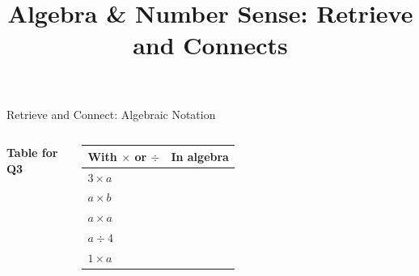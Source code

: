 \documentclass{beamer}
\title{Algebra \& Number Sense: Retrieve and Connects}
\author{}
\date{}
\newcommand{\ablank}[1]{%
  \alt<2>{\textcolor{red}{#1}}{\underline{\phantom{#1}}}%
}
\newcommand{\dheading}[1]{{\scriptsize\bfseries #1}\par\vspace{0.2em}}
\newcommand{\tblank}[1]{\ablank{\makebox[1.6em]{#1}}}
\newcommand{\tgiven}[1]{\makebox[1.6em]{#1}}
\begin{document}
\frame{\titlepage}

\begin{frame}[t]{Retrieve and Connect: Algebraic Notation}
\begin{columns}[T,onlytextwidth]

\vspace{-0.4em}
\dheading{Table for Q3}
{\footnotesize
\renewcommand{\arraystretch}{1.25}
\begin{tabular}{@{}l|l@{}}
  With $\times$ or $\div$ & In algebra\\ \hline
  $3\times a$ & \tgiven{$3a$}\\
  $a\times b$ & \tblank{$ab$}\\
  $a\times a$ & \tblank{$a^2$}\\
  $a\div4$    & \tblank{$\dfrac{a}{4}$}\\[2pt]
  $1\times a$ & \tblank{$a$}
\end{tabular}}


\end{columns}
\end{frame}
\end{document}
